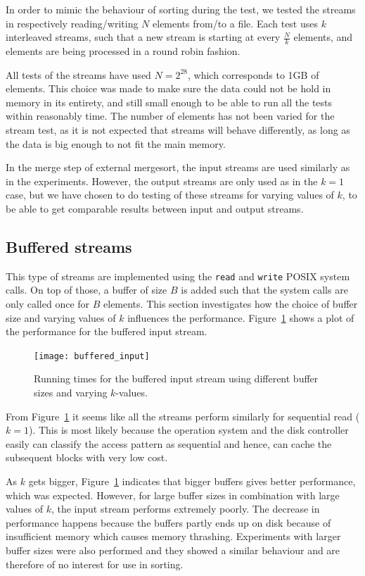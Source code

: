 \documentclass[a4paper,12pt]{article}
\begin{document}
In order to mimic the behaviour of sorting during the test, we
tested the streams in respectively reading/writing $N$ elements from/to a file. Each test uses $k$ interleaved streams, such
that a new stream is starting at every $\frac{N}{k}$ elements, and
elements are being processed in a round robin fashion.

All tests of the streams have used $N = 2^{28}$, which corresponds to
1GB of elements. This choice was made to make sure the data could not be hold in memory in its entirety, and still small enough to be able to run all the tests within reasonably time. The
number of elements has not been varied for the stream test, as it is not
expected that streams will behave differently, as long as the data is
big enough to not fit the main memory.

In the merge step of external mergesort, the input streams are
used similarly as in the experiments. However, the output streams are only used
as in the $k = 1$ case, but we have chosen to do testing of these streams
for varying values of $k$, to be able to get comparable results
between input and output streams.

\subsection{Buffered streams}
\label{sec:buffered-streams}
This type of streams are implemented using the \texttt{read} and
\texttt{write} POSIX system calls. On top of those, a buffer of size
$B$ is added such that the system calls are only called once for $B$ elements. This section investigates how the choice of buffer size and varying
values of $k$ influences the
performance.
Figure~\ref{fig:buffered-input} shows a plot of the performance for the buffered input stream.

\begin{figure}[h!]
  \centering
  \texttt{[image: buffered\_input]}
  \caption{Running times for the buffered input stream using different
    buffer sizes and varying $k$-values.}
  \label{fig:buffered-input}
\end{figure}

From Figure~\ref{fig:buffered-input} it seems like all the streams
perform similarly for sequential read ($k = 1$). This is most likely because the operation system and the disk controller easily can classify the access pattern as sequential and hence, can cache the subsequent blocks with very low cost.

As $k$ gets bigger, Figure~\ref{fig:buffered-input} indicates that
bigger buffers gives better performance, which was expected. However,
for large buffer sizes in combination with large values of $k$, the
input stream performs extremely poorly. The decrease in performance happens because the
buffers partly ends up on disk because of insufficient memory which causes memory thrashing. Experiments with larger buffer sizes were also performed and they
showed a similar behaviour and are therefore of no
interest for use in sorting.
\end{document}

